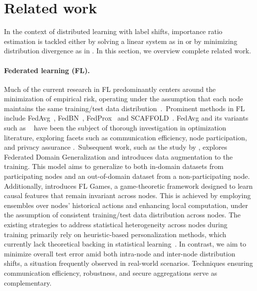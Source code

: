 \newpage
\section{Related work}\label{app:relatedwork}
In the context of distributed learning with label shifts, importance ratio estimation is tackled either by solving a linear system as in \citep{bbse, rlls} or by minimizing distribution divergence as in \citep{mlls}. In this section, we overview complete related work. 

\paragraph{Federated learning (FL).} Much of the current research in FL predominantly centers around the minimization of empirical risk, operating under the assumption that each node maintains the same training/test data distribution~\citep{FL}.~Prominent methods in FL include  FedAvg~\citep{FedAvg}, FedBN~\citep{fedbn}, FedProx~\citep{fedprox} and SCAFFOLD~\citep{SCAFFOLD}. FedAvg and its variants such as ~\citep{huang2021personalized, pmlr-v119-karimireddy20a} 
have been the subject of thorough investigation in optimization literature, exploring facets such as communication efficiency, node participation, and privacy assurance \citep{ALQ,NUQSGD,QGenX,ali2023federated}.~Subsequent work, such as the study by \citet{de2022mitigating}, explores Federated Domain Generalization and introduces data augmentation to the training. This model aims to generalize to both in-domain datasets from participating nodes and an out-of-domain dataset from a non-participating node. Additionally, \citet{gupta2022fl} introduces FL Games, a game-theoretic framework designed to learn causal features that remain invariant across nodes. This is achieved by employing ensembles over nodes' historical actions and enhancing local computation, under the assumption of consistent training/test data distribution across nodes. The existing strategies to address statistical heterogeneity across nodes during training primarily rely on heuristic-based personalization methods, which currently lack theoretical backing in statistical learning~\citep{FLMultiTask,Khodak,li2021ditto}.  In contrast, we aim to minimize overall test error amid both intra-node and inter-node distribution shifts, a situation frequently observed in real-world scenarios. Techniques ensuring communication efficiency, robustness, and secure aggregations serve as complementary.

